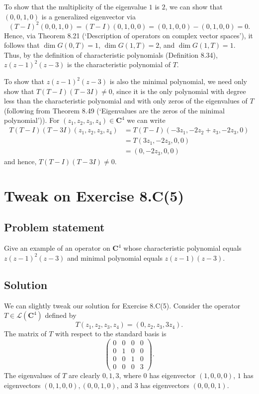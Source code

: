 \documentclass{article}
\begin{document}
To show that the multiplicity of the eigenvalue $1$ is $2$, we can show that $(0,0,1,0)$ is a generalized eigenvector via
\[(T-I)^2(0,0,1,0)=(T-I)(0,1,0,0)=(0,1,0,0)-(0,1,0,0)=0.\]
Hence, via Theorem 8.21 (`Description of operators on complex vector spaces'), it follows that $\operatorname{dim}G(0,T)=1$, $\operatorname{dim}G(1,T)=2$, and $\operatorname{dim}G(1,T)=1$. 
Thus, by the definition of characteristic polynomials (Definition 8.34), $z(z-1)^2(z-3)$ is the characteristic polynomial of $T$.

To show that $z(z-1)^2(z-3)$ is also the minimal polynomial, we need only show that $T(T-I)(T-3I)\neq 0$, since it is the only polynomial with degree less than the characteristic polynomial and with only zeros of the eigenvalues of $T$ (following from Theorem 8.49 (`Eigenvalues are the zeros of the minimal polynomial')). 
For $(z_1,z_2,z_3,z_4)\in\mathbf{C}^4$ we can write
\begin{align*}
    T(T-I)(T-3I)(z_1,z_2,z_3,z_4)&=T(T-I)(-3z_1,-2z_2+z_3,-2z_3,0)\\
    &=T(3z_1,-2z_3,0,0)\\
    &=(0,-2z_3,0,0)
\end{align*}
and hence, $T(T-I)(T-3I)\neq 0$. 

\clearpage

\section{Tweak on Exercise 8.C(5)}
\subsection*{Problem statement}
Give an example of an operator on $\mathbf{C}^4$ whose characteristic polynomial equals $z(z-1)^2(z-3)$ and minimal polynomial equals $z(z-1)(z-3)$.

\subsection*{Solution}
We can slightly tweak our solution for Exercise 8.C(5). 
Consider the operator $T\in\mathcal{L}(\mathbf{C}^4)$ defined by
\begin{equation*}
T(z_1,z_2,z_3,z_4)=(0,z_2,z_3,3z_4).
\end{equation*}
The matrix of $T$ with respect to the standard basis is
\begin{equation*}
\begin{pmatrix}
0 & 0 & 0 & 0\\
0 & 1 & 0 & 0\\
0 & 0 & 1 & 0\\
0 & 0 & 0 & 3
\end{pmatrix}.
\end{equation*}
The eigenvalues of $T$ are clearly $0,1,3$, where $0$ has eigenvector $(1,0,0,0)$, $1$ has eigenvectors $(0,1,0,0),(0,0,1,0)$, and $3$ has eigenvectors $(0,0,0,1)$. 
\end{document}
